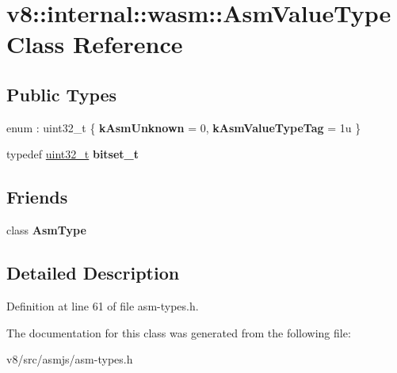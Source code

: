 \hypertarget{classv8_1_1internal_1_1wasm_1_1AsmValueType}{}\section{v8\+:\+:internal\+:\+:wasm\+:\+:Asm\+Value\+Type Class Reference}
\label{classv8_1_1internal_1_1wasm_1_1AsmValueType}
\subsection*{Public Types}
\begin{DoxyCompactItemize}
\item 
\mbox{\label{classv8_1_1internal_1_1wasm_1_1AsmValueType_ade49b0caff628e6ec46f1cd889d00e3d}} 
enum \+: uint32\+\_\+t \{ {\bfseries k\+Asm\+Unknown} = 0, 
{\bfseries k\+Asm\+Value\+Type\+Tag} = 1u
 \}
\item 
\mbox{\label{classv8_1_1internal_1_1wasm_1_1AsmValueType_ab7338928d05935f43e642eeeb0e41f7e}} 
typedef \mbox{\hyperlink{classuint32__t}{uint32\+\_\+t}} {\bfseries bitset\+\_\+t}
\end{DoxyCompactItemize}
\subsection*{Friends}
\begin{DoxyCompactItemize}
\item 
\mbox{\label{classv8_1_1internal_1_1wasm_1_1AsmValueType_a1e63eeb293d5ca2da4a3eca09d76d5af}} 
class {\bfseries Asm\+Type}
\end{DoxyCompactItemize}


\subsection{Detailed Description}


Definition at line 61 of file asm-\/types.\+h.



The documentation for this class was generated from the following file\+:\begin{DoxyCompactItemize}
\item 
v8/src/asmjs/asm-\/types.\+h\end{DoxyCompactItemize}
